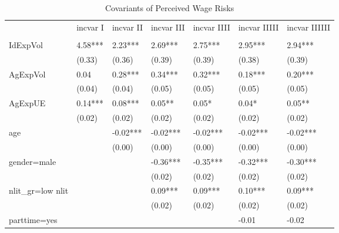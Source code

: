 \clearpage


\begin{table}[p]
\centering
\begin{adjustbox}{width=\textwidth}
\begin{threeparttable}
\caption{Covariants of Perceived Wage Risks}
\label{micro_reg}\begin{tabular}{lllllll}
\toprule
{} & incvar I & incvar II & incvar III & incvar IIII & incvar IIIII & incvar IIIIII \\
                    &          &           &            &             &              &               \\
\midrule
IdExpVol            &  4.58*** &   2.23*** &    2.69*** &     2.75*** &      2.95*** &       2.94*** \\
                    &   (0.33) &    (0.36) &     (0.39) &      (0.39) &       (0.38) &        (0.39) \\
AgExpVol            &     0.04 &   0.28*** &    0.34*** &     0.32*** &      0.18*** &       0.20*** \\
                    &   (0.04) &    (0.04) &     (0.05) &      (0.05) &       (0.05) &        (0.05) \\
AgExpUE             &  0.14*** &   0.08*** &     0.05** &       0.05* &        0.04* &        0.05** \\
                    &   (0.02) &    (0.02) &     (0.02) &      (0.02) &       (0.02) &        (0.02) \\
age                 &          &  -0.02*** &   -0.02*** &    -0.02*** &     -0.02*** &      -0.02*** \\
                    &          &    (0.00) &     (0.00) &      (0.00) &       (0.00) &        (0.00) \\
gender=male         &          &           &   -0.36*** &    -0.35*** &     -0.32*** &      -0.30*** \\
                    &          &           &     (0.02) &      (0.02) &       (0.02) &        (0.02) \\
nlit\_gr=low nlit    &          &           &    0.09*** &     0.09*** &      0.10*** &       0.09*** \\
                    &          &           &     (0.02) &      (0.02) &       (0.02) &        (0.02) \\
parttime=yes        &          &           &            &             &        -0.01 &         -0.02 \\

\end{tabular}
\end{threeparttable}
\end{adjustbox}
\end{table}
